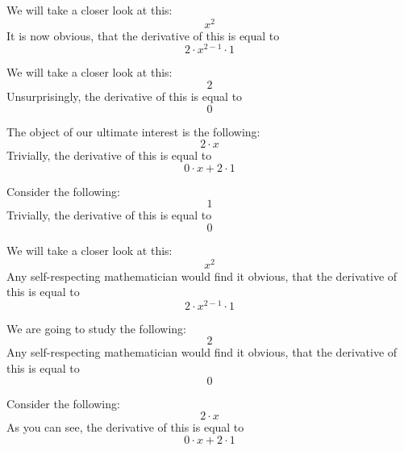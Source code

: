\documentclass{article}
\begin{document}
We will take a closer look at this:
\begin{equation}
x ^{2 } 
\end{equation}
It is now obvious, that the derivative of this is equal to
\begin{equation}
2 \cdot x ^{2 - 1 } \cdot 1 
\end{equation}

We will take a closer look at this:
\begin{equation}
2 
\end{equation}
Unsurprisingly, the derivative of this is equal to
\begin{equation}
0 
\end{equation}

The object of our ultimate interest is the following:
\begin{equation}
2 \cdot x 
\end{equation}
Trivially, the derivative of this is equal to
\begin{equation}
0 \cdot x + 2 \cdot 1 
\end{equation}

Consider the following:
\begin{equation}
1 
\end{equation}
Trivially, the derivative of this is equal to
\begin{equation}
0 
\end{equation}

We will take a closer look at this:
\begin{equation}
x ^{2 } 
\end{equation}
Any self-respecting mathematician would find it obvious, that the derivative of this is equal to
\begin{equation}
2 \cdot x ^{2 - 1 } \cdot 1 
\end{equation}

We are going to study the following:
\begin{equation}
2 
\end{equation}
Any self-respecting mathematician would find it obvious, that the derivative of this is equal to
\begin{equation}
0 
\end{equation}

Consider the following:
\begin{equation}
2 \cdot x 
\end{equation}
As you can see, the derivative of this is equal to
\begin{equation}
0 \cdot x + 2 \cdot 1 
\end{equation}
\end{document}
